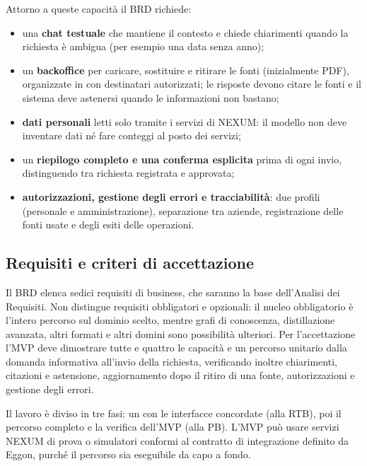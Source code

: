 Attorno a queste capacità il BRD richiede:
\begin{itemize}
  \item una \textbf{chat testuale} che mantiene il contesto e chiede
        chiarimenti quando la richiesta è ambigua (per esempio una data
        senza anno);
  \item un \textbf{backoffice} per caricare, sostituire e ritirare le fonti
        (inizialmente PDF), organizzate in  con destinatari
        autorizzati; le risposte devono citare le fonti e il sistema deve
        astenersi quando le informazioni non bastano;
  \item \textbf{dati personali} letti solo tramite i servizi di NEXUM: il
        modello non deve inventare dati né fare conteggi al posto dei
        servizi;
  \item un \textbf{riepilogo completo e una conferma esplicita} prima di
        ogni invio, distinguendo tra richiesta registrata e approvata;
  \item \textbf{autorizzazioni, gestione degli errori e tracciabilità}:
        due profili (personale e amministrazione), separazione tra aziende,
        registrazione delle fonti usate e degli esiti delle operazioni.
\end{itemize}

\subsection{Requisiti e criteri di accettazione}
Il BRD elenca sedici requisiti di business, che saranno la base
dell'Analisi dei Requisiti. Non distingue requisiti obbligatori e
opzionali: il nucleo obbligatorio è l'intero percorso sul dominio scelto,
mentre grafi di conoscenza, distillazione avanzata, altri formati e altri
domini sono possibilità ulteriori. Per l'accettazione l'MVP deve
dimostrare tutte e quattro le capacità e un percorso unitario dalla
domanda informativa all'invio della richiesta, verificando inoltre
chiarimenti, citazioni e astensione, aggiornamento dopo il ritiro di una
fonte, autorizzazioni e gestione degli errori.

Il lavoro è diviso in tre fasi: un  con le interfacce concordate
(alla RTB), poi il percorso completo e la verifica dell'MVP (alla PB).
L'MVP può usare servizi NEXUM di prova o simulatori conformi al contratto
di integrazione definito da Eggon, purché il percorso sia eseguibile da
capo a fondo.

